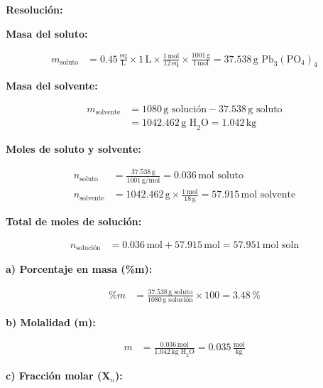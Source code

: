 \documentclass{article}
\begin{document}

\noindent\textbf{Resolución:} %

\textbf{Masa del soluto:}

\begin{align*}
    m_{\text{soluto}} &= 0.45 \, \frac{\text{eq}}{\text{L}} \times 1 \, \text{L} \times \frac{1 \, \text{mol}}{12 \, \text{eq}} \times \frac{1001 \, \text{g}}{1 \, \text{mol}} = 37.538 \, \text{g Pb}_3(\text{PO}_4)_4
\end{align*}

\textbf{Masa del solvente:}

\begin{align*}
    m_{\text{solvente}} &= 1080 \, \text{g solución} - 37.538 \, \text{g soluto} \\
    &= 1042.462 \, \text{g H}_2\text{O} = 1.042 \, \text{kg}
\end{align*}

\textbf{Moles de soluto y solvente:}

\begin{align*}
    n_{\text{soluto}} &= \frac{37.538 \, \text{g}}{1001 \, \text{g/mol}} = 0.036 \, \text{mol soluto} \\[10pt]
    n_{\text{solvente}} &= 1042.462 \, \text{g} \times \frac{1 \, \text{mol}}{18 \, \text{g}} = 57.915 \, \text{mol solvente}
\end{align*}

\textbf{Total de moles de solución:}

\begin{align*}
    n_{\text{solución}} &= 0.036 \, \text{mol} + 57.915 \, \text{mol} = 57.951 \, \text{mol soln}
\end{align*}

\textbf{a) Porcentaje en masa (\%m):}

\begin{align*}
    \%m &= \frac{37.538 \, \text{g soluto}}{1080 \, \text{g solución}} \times 100 = 3.48 \, \%
\end{align*}

\textbf{b) Molalidad (m):}

\begin{align*}
    m &= \frac{0.036 \, \text{mol}}{1.042 \, \text{kg H}_2\text{O}} = 0.035 \, \frac{\text{mol}}{\text{kg}}
\end{align*}

\textbf{c) Fracción molar (X$_n$):}
\end{document}
